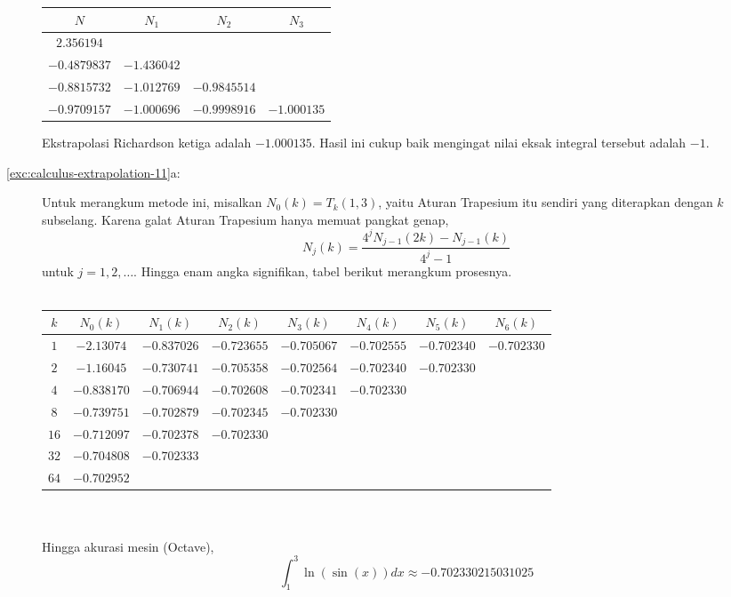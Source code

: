 \begin{description}
\begin{center}
\begin{tabular}{cccc}
$N$ & $N_{1}$ & $N_{2}$ & $N_{3}$\tabularnewline
\hline 
$2.356194$ &  &  & \tabularnewline
$-0.4879837$ & $-1.436042$ &  & \tabularnewline
$-0.8815732$ & $-1.012769$ & $-0.9845514$ & \tabularnewline
$-0.9709157$ & $-1.000696$ & $-0.9998916$ & $-1.000135$\tabularnewline
\end{tabular}
\par\end{center}

Ekstrapolasi Richardson ketiga adalah $-1.000135$. Hasil ini cukup
baik mengingat nilai eksak integral tersebut adalah $-1$.
\item [{\ref{exc:calculus-extrapolation-11}a:}] Untuk merangkum metode
ini, misalkan $N_{0}(k)=T_{k}(1,3)$, yaitu Aturan Trapesium itu sendiri
yang diterapkan dengan $k$ subselang. Karena galat Aturan Trapesium
hanya memuat pangkat genap, 
\[
N_{j}(k)=\frac{4^{j}N_{j-1}(2k)-N_{j-1}(k)}{4^{j}-1}
\]
untuk $j=1,2,\ldots$. Hingga enam angka signifikan, tabel berikut
merangkum prosesnya.\\
\\
\begin{tabular}{c|ccccccc}
$k$ & $N_{0}(k)$ & $N_{1}(k)$ & $N_{2}(k)$ & $N_{3}(k)$ & $N_{4}(k)$ & $N_{5}(k)$ & $N_{6}(k)$\tabularnewline
\hline 
$1$ & $-2.13074$ & $-0.837026$ & $-0.723655$ & $-0.705067$ & $-0.702555$ & $-0.702340$ & $-0.702330$\tabularnewline
$2$ & $-1.16045$ & $-0.730741$ & $-0.705358$ & $-0.702564$ & $-0.702340$ & $-0.702330$ & \tabularnewline
$4$ & $-0.838170$ & $-0.706944$ & $-0.702608$ & $-0.702341$ & $-0.702330$ &  & \tabularnewline
$8$ & $-0.739751$ & $-0.702879$ & $-0.702345$ & $-0.702330$ &  &  & \tabularnewline
$16$ & $-0.712097$ & $-0.702378$ & $-0.702330$ &  &  &  & \tabularnewline
$32$ & $-0.704808$ & $-0.702333$ &  &  &  &  & \tabularnewline
$64$ & $-0.702952$ &  &  &  &  &  & \tabularnewline
\end{tabular}\\
\\
Hingga akurasi mesin (Octave),
\[
\int_{1}^{3}\ln(\sin(x))dx\approx-0.702330215031025
\]
\end{description}

